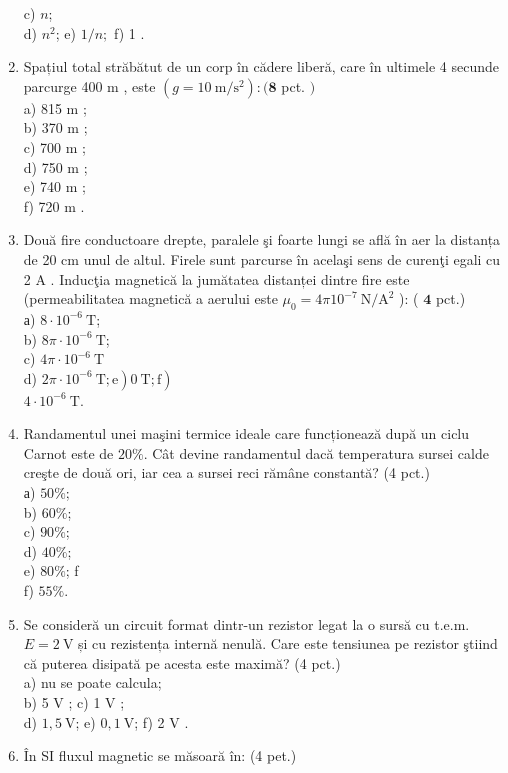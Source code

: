 \begin{enumerate}
c) $n$;\\
d) $n^{2}$; e) $1 / n ;$ f) 1 .
  \item Spațiul total străbătut de un corp în cădere liberă, care în ultimele 4 secunde parcurge 400 m , este $\left(g=10 \mathrm{~m} / \mathrm{s}^{2}\right):(\mathbf{8}$ pct. $)$\\
a) 815 m ;\\
b) 370 m ;\\
c) 700 m ;\\
d) 750 m ;\\
e) 740 m ;\\
f) 720 m .
  \item Două fire conductoare drepte, paralele şi foarte lungi se află în aer la distanța de 20 cm unul de altul. Firele sunt parcurse în acelaşi sens de curenţi egali cu 2 A . Inducţia magnetică la jumătatea distanței dintre fire este (permeabilitatea magnetică a aerului este $\mu_{0}=4 \pi 10^{-7} \mathrm{~N} / \mathrm{A}^{2}$ ): ( $\mathbf{4}$ pct.)\\
а) $8 \cdot 10^{-6} \mathrm{~T}$;\\
b) $8 \pi \cdot 10^{-6} \mathrm{~T}$;\\
c) $4 \pi \cdot 10^{-6} \mathrm{~T}$\\
d) $\left.\left.2 \pi \cdot 10^{-6} \mathrm{~T} ; \mathrm{e}\right) 0 \mathrm{~T} ; \mathrm{f}\right)$\\
$4 \cdot 10^{-6} \mathrm{~T}$.
  \item Randamentul unei maşini termice ideale care funcționează după un ciclu Carnot este de $20 \%$. Cât devine randamentul dacă temperatura sursei calde creşte de două ori, iar cea a sursei reci rămâne constantă? (4 pct.)\\
а) $50 \%$;\\
b) $60 \%$;\\
c) $90 \%$;\\
d) $40 \%$;\\
e) $80 \%$; f\\
f) $55 \%$.
  \item Se consideră un circuit format dintr-un rezistor legat la o sursă cu t.e.m. $E=2 \mathrm{~V}$ și cu rezistența internă nenulă. Care este tensiunea pe rezistor ştiind că puterea disipată pe acesta este maximă? (4 pct.)\\
a) nu se poate calcula;\\
b) 5 V ; c) 1 V ;\\
d) $1,5 \mathrm{~V}$; e) $0,1 \mathrm{~V}$; f) 2 V .
  \item În SI fluxul magnetic se măsoară în: (4 pet.)\\

\end{enumerate}
